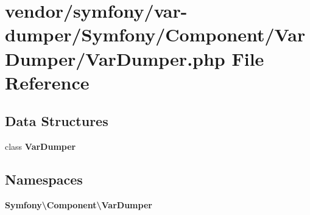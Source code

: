 \section{vendor/symfony/var-\/dumper/\+Symfony/\+Component/\+Var\+Dumper/\+Var\+Dumper.php File Reference}
\label{_var_dumper_8php}
\subsection*{Data Structures}
\begin{DoxyCompactItemize}
\item 
class {\bf Var\+Dumper}
\end{DoxyCompactItemize}
\subsection*{Namespaces}
\begin{DoxyCompactItemize}
\item 
 {\bf Symfony\textbackslash{}\+Component\textbackslash{}\+Var\+Dumper}
\end{DoxyCompactItemize}
